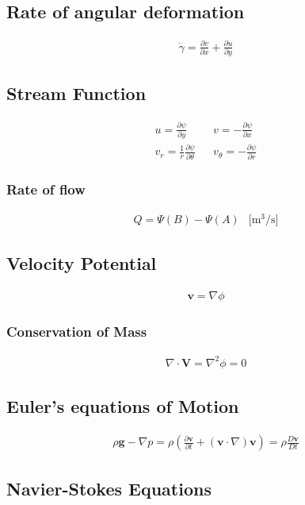\documentclass[a4paper]{amsart}
\begin{document}
\subsection{Rate of angular deformation}
\begin{eqnarray*}
	\dot \gamma=\frac{\partial v}{\partial x} + \frac{\partial u}{\partial y}
\end{eqnarray*}

\subsection{Stream Function}
\begin{eqnarray*}
	u=\frac{\partial \psi}{\partial y}
&&	v=-\frac{\partial \psi}{\partial x}	
\\
	v_r=\frac{1}{r}\frac{\partial \psi}{\partial \theta}
&&	v_\theta=-\frac{\partial \psi}{\partial r}
\end{eqnarray*}
\subsubsection{Rate of flow}
\begin{eqnarray*}
	Q=\Psi(B) - \Psi(A) & \text{[m$^3$/s]}
\end{eqnarray*}
\subsection{Velocity Potential}
\begin{eqnarray*}
	\mathbf{v}=\nabla\phi
\end{eqnarray*}
\subsubsection{Conservation of Mass}
\begin{eqnarray*}
	\nabla\cdot \mathbf{V}=\nabla^2\phi=0
\end{eqnarray*}

\subsection{Euler's equations of Motion}
\begin{eqnarray*}
	\rho \mathbf{g}-\nabla p=\rho\left(\frac{\partial \mathbf{v}}{\partial t}+(\mathbf{v}\cdot\nabla)\mathbf{v}\right)=\rho\frac{D \mathbf{v}}{Dt}
\end{eqnarray*}

\subsection{Navier-Stokes Equations}
\end{document}
